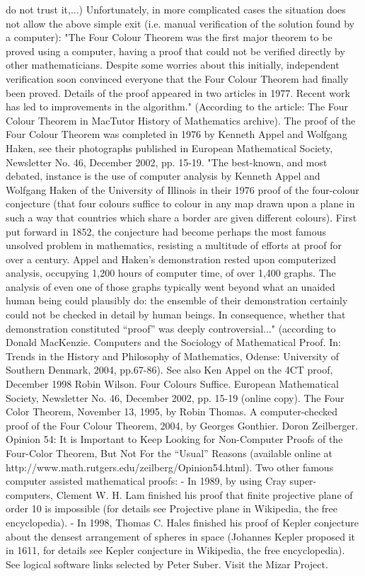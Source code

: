 do not trust it,...)
Unfortunately, in more complicated cases the situation does not allow the above simple exit (i.e. manual verification of the
solution found by a computer):
"The Four Colour Theorem was the first major theorem to be proved using a computer, having a proof that could not be
verified directly by other mathematicians. Despite some worries about this initially, independent verification soon convinced
everyone that the Four Colour Theorem had finally been proved. Details of the proof appeared in two articles in 1977. Recent
work has led to improvements in the algorithm." (According to the article: The Four Colour Theorem in MacTutor History of
Mathematics archive).
The proof of the Four Colour Theorem was completed in 1976 by Kenneth Appel and Wolfgang Haken, see their photographs
published in European Mathematical Society, Newsletter No. 46, December 2002, pp. 15-19.
"The best-known, and most debated, instance is the use of computer analysis by Kenneth Appel and Wolfgang Haken of the
University of Illinois in their 1976 proof of the four-colour conjecture (that four colours suffice to colour in any map drawn
upon a plane in such a way that countries which share a border are given different colours). First put forward in 1852, the
conjecture had become perhaps the most famous unsolved problem in mathematics, resisting a multitude of efforts at proof for
over a century. Appel and Haken's demonstration rested upon computerized analysis, occupying 1,200 hours of computer time,
of over 1,400 graphs. The analysis of even one of those graphs typically went beyond what an unaided human being could
plausibly do: the ensemble of their demonstration certainly could not be checked in detail by human beings. In consequence,
whether that demonstration constituted ``proof'' was deeply controversial..." (according to
Donald MacKenzie. Computers and the Sociology of Mathematical Proof. In: Trends in the History and Philosophy of
Mathematics, Odense: University of Southern Denmark, 2004, pp.67-86).
See also
Ken Appel on the 4CT proof, December 1998
Robin Wilson. Four Colours Suffice. European Mathematical Society, Newsletter No. 46, December 2002, pp. 15-19 (online
copy).
The Four Color Theorem, November 13, 1995, by Robin Thomas.
A computer-checked proof of the Four Colour Theorem, 2004, by Georges Gonthier.
Doron Zeilberger. Opinion 54: It is Important to Keep Looking for Non-Computer Proofs of the Four-Color Theorem, But Not
For the ``Usual'' Reasons (available online at http://www.math.rutgers.edu/\neg zeilberg/Opinion54.html).
Two other famous computer assisted mathematical proofs:
- In 1989, by using Cray super-computers, Clement W. H. Lam finished his proof that finite projective plane of order 10 is
impossible (for details see Projective plane in Wikipedia, the free encyclopedia).
- In 1998, Thomas C. Hales finished his proof of Kepler conjecture about the densest arrangement of spheres in space
(Johannes Kepler proposed it in 1611, for details see Kepler conjecture in Wikipedia, the free encyclopedia).
See logical software links selected by Peter Suber.
Visit the Mizar Project.
